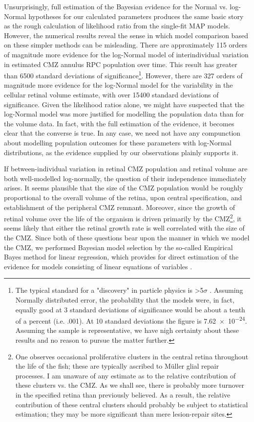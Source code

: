 Unsurprisingly, full estimation of the Bayesian evidence for the Normal vs. log-Normal hypotheses for our calculated parameters produces the same basic story as the rough calculation of likelihood ratio from the single-fit MAP models. However, the numerical results reveal the sense in which model comparison based on these simpler methods can be misleading. There are approximately 115 orders of magnitude more evidence for the log-Normal model of interindividual variation in estimated CMZ annulus RPC population over time. This result has greater than 6500 standard deviations of significance\footnote{The typical standard for a "discovery" in particle physics is >5$\sigma$ \cite{Lyons2013}. Assuming Normally distributed error, the probability that the models were, in fact, equally good at 3 standard deviations of significance would be about a tenth of a percent (i.e. .001). At 10 standard deviations the figure is \num{7.62e-24}. Assuming the sample is representative, we have nigh certainty about these results and no reason to pursue the matter further.}. However, there are 327 orders of magnitude more evidence for the log-Normal model for the variability in the cellular retinal volume estimate, with over 15400 standard deviations of significance. Given the likelihood ratios alone, we might have suspected that the log-Normal model was more justified for modelling the population data than for the volume data. In fact, with the full estimation of the evidence, it becomes clear that the converse is true. In any case, we need not have any compunction about modelling population outcomes for these parameters with log-Normal distributions, as the evidence supplied by our observations plainly supports it.

If between-individual variation in retinal CMZ population and retinal volume are both well-modelled log-normally, the question of their independence immediately arises. It seems plausible that the size of the CMZ population would be roughly proportional to the overall volume of the retina, upon central specification, and establishment of the peripheral CMZ remnant. Moreover, since the growth of retinal volume over the life of the organism is driven primarily by the CMZ\footnote{One observes occasional proliferative clusters in the central retina throughout the life of the fish; these are typically ascribed to M\"{u}ller glial repair processes. I am unaware of any estimate as to the relative contribution of these clusters vs. the CMZ. As we shall see, there is probably more turnover in the specified retina than previously believed. As a result, the relative contribution of these central clusters should probably be subject to statistical estimation; they may be more significant than mere lesion-repair sites.}, it seems likely that either the retinal growth rate is well correlated with the size of the CMZ. Since both of these questions bear upon the manner in which we model the CMZ, we performed Bayesian model selection by the so-called Empirical Bayes method for linear regression, which provides for direct estimation of the evidence for models consisting of linear equations of variables \cite{Bishop2006}.

